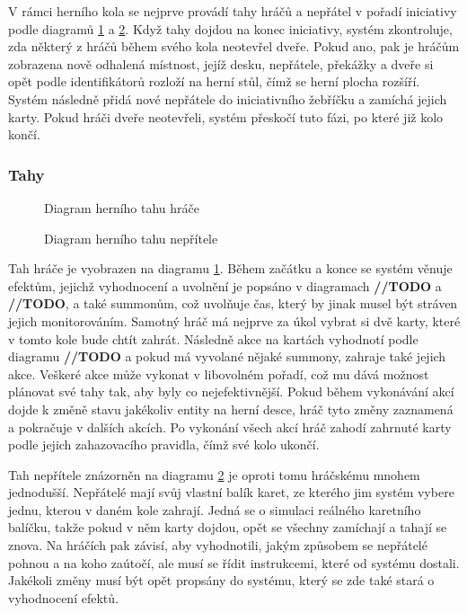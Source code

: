 V rámci herního kola se nejprve provádí tahy hráčů a nepřátel v pořadí iniciativy podle diagramů \ref{diag:player_turn} a \ref{diag:enemy_turn}. Když tahy dojdou na konec iniciativy, systém zkontroluje, zda některý z hráčů během svého kola neotevřel dveře. Pokud ano, pak je hráčům zobrazena nově odhalená místnost, jejíž desku, nepřátele, překážky a dveře si opět podle identifikátorů rozloží na herní stůl, čímž se herní plocha rozšíří. Systém následně přidá nové nepřátele do iniciativního žebříčku a zamíchá jejich karty. Pokud hráči dveře neotevřeli, systém přeskočí tuto fázi, po které již kolo končí.


\subsubsection*{Tahy}
\label{subsubsec:turns}

\begin{figure}[H]
    \centering
    \caption{Diagram herního tahu hráče}
    \label{diag:player_turn}
\end{figure}

\begin{figure}[H]
    \centering
    \caption{Diagram herního tahu nepřítele}
    \label{diag:enemy_turn}
\end{figure}

Tah hráče je vyobrazen na diagramu \ref{diag:player_turn}. Během začátku a konce se systém věnuje efektům, jejichž vyhodnocení a uvolnění je popsáno v diagramach \textbf{//TODO} a \textbf{//TODO}, a také summonům, což uvolňuje čas, který by jinak musel být stráven jejich monitorováním. Samotný hráč má nejprve za úkol vybrat si dvě karty, které v tomto kole bude chtít zahrát. Následně akce na kartách vyhodnotí podle diagramu \textbf{//TODO} a pokud má vyvolané nějaké summony, zahraje také jejich akce. Veškeré akce může vykonat v libovolném pořadí, což mu dává možnost plánovat své tahy tak, aby byly co nejefektivnější. Pokud během vykonávání akcí dojde k změně stavu jakékoliv entity na herní desce, hráč tyto změny zaznamená a pokračuje v dalších akcích. Po vykonání všech akcí hráč zahodí zahrnuté karty podle jejich zahazovacího pravidla, čímž své kolo ukončí.

Tah nepřítele znázorněn na diagramu \ref{diag:enemy_turn} je oproti tomu hráčskému mnohem jednodušší. Nepřátelé mají svůj vlastní balík karet, ze kterého jim systém vybere jednu, kterou v daném kole zahrají. Jedná se o simulaci reálného karetního balíčku, takže pokud v něm karty dojdou, opět se všechny zamíchají a tahají se znova. Na hráčích pak závisí, aby vyhodnotili, jakým způsobem se nepřátelé pohnou a na koho zaútočí, ale musí se řídit instrukcemi, které od systému dostali. Jakékoli změny musí být opět propsány do systému, který se zde také stará o vyhodnocení efektů.


